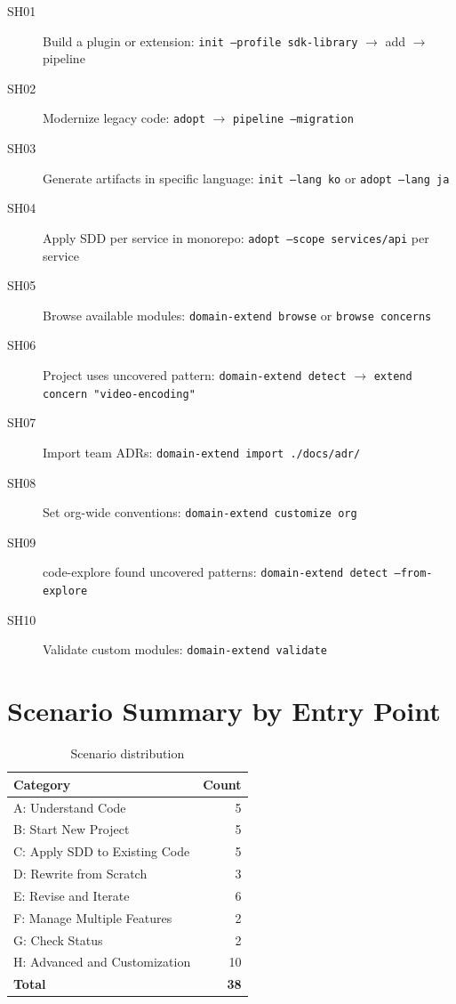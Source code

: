 \documentclass[11pt,a4paper,openright,twoside]{report}
\begin{document}
\begin{description}
  \item[SH01] Build a plugin or extension: \texttt{init --profile sdk-library} $\rightarrow$ add $\rightarrow$ pipeline
  \item[SH02] Modernize legacy code: \texttt{adopt} $\rightarrow$ \texttt{pipeline --migration}
  \item[SH03] Generate artifacts in specific language: \texttt{init --lang ko} or \texttt{adopt --lang ja}
  \item[SH04] Apply SDD per service in monorepo: \texttt{adopt --scope services/api} per service
  \item[SH05] Browse available modules: \texttt{domain-extend browse} or \texttt{browse concerns}
  \item[SH06] Project uses uncovered pattern: \texttt{domain-extend detect} $\rightarrow$ \texttt{extend concern "video-encoding"}
  \item[SH07] Import team ADRs: \texttt{domain-extend import ./docs/adr/}
  \item[SH08] Set org-wide conventions: \texttt{domain-extend customize org}
  \item[SH09] code-explore found uncovered patterns: \texttt{domain-extend detect --from-explore}
  \item[SH10] Validate custom modules: \texttt{domain-extend validate}
\end{description}

\section{Scenario Summary by Entry Point}

\begin{table}[H]
\centering
\caption{Scenario distribution}
\label{tab:scenario-summary}
\begin{tabular}{lr}
\toprule
\textbf{Category} & \textbf{Count} \\
\midrule
A: Understand Code & 5 \\
B: Start New Project & 5 \\
C: Apply SDD to Existing Code & 5 \\
D: Rewrite from Scratch & 3 \\
E: Revise and Iterate & 6 \\
F: Manage Multiple Features & 2 \\
G: Check Status & 2 \\
H: Advanced and Customization & 10 \\
\midrule
\textbf{Total} & \textbf{38} \\
\bottomrule
\end{tabular}
\end{table}
\end{document}
